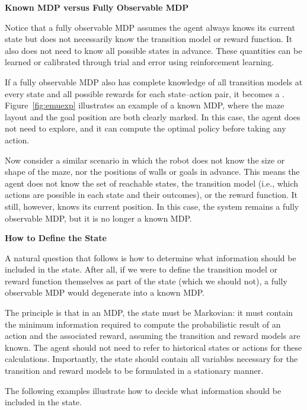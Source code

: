 \begin{mdframed}
	\noindent \textbf{Known MDP versus Fully Observable MDP}
	
	Notice that a fully observable MDP assumes the agent always knows its current state but does not necessarily know the transition model or reward function. It also does not need to know all possible states in advance. These quantities can be learned or calibrated through trial and error using reinforcement learning.
	
	If a fully observable MDP also has complete knowledge of all transition models at every state and all possible rewards for each state–action pair, it becomes a . Figure~\ref{fig:emuexp} illustrates an example of a known MDP, where the maze layout and the goal position are both clearly marked. In this case, the agent does not need to explore, and it can compute the optimal policy before taking any action.
	
	Now consider a similar scenario in which the robot does not know the size or shape of the maze, nor the positions of walls or goals in advance. This means the agent does not know the set of reachable states, the transition model (i.e., which actions are possible in each state and their outcomes), or the reward function. It still, however, knows its current position. In this case, the system remains a fully observable MDP, but it is no longer a known MDP.
	
	\vspace{0.1in}
	\noindent \textbf{How to Define the State}
	
	A natural question that follows is how to determine what information should be included in the state. After all, if we were to define the transition model or reward function themselves as part of the state (which we should not), a fully observable MDP would degenerate into a known MDP.
	
	The principle is that in an MDP, the state must be Markovian: it must contain the minimum information required to compute the probabilistic result of an action and the associated reward, assuming the transition and reward models are known. The agent should not need to refer to historical states or actions for these calculations. Importantly, the state should contain all variables necessary for the transition and reward models to be formulated in a stationary manner.
	
	The following examples illustrate how to decide what information should be included in the state.
	

\end{mdframed}
